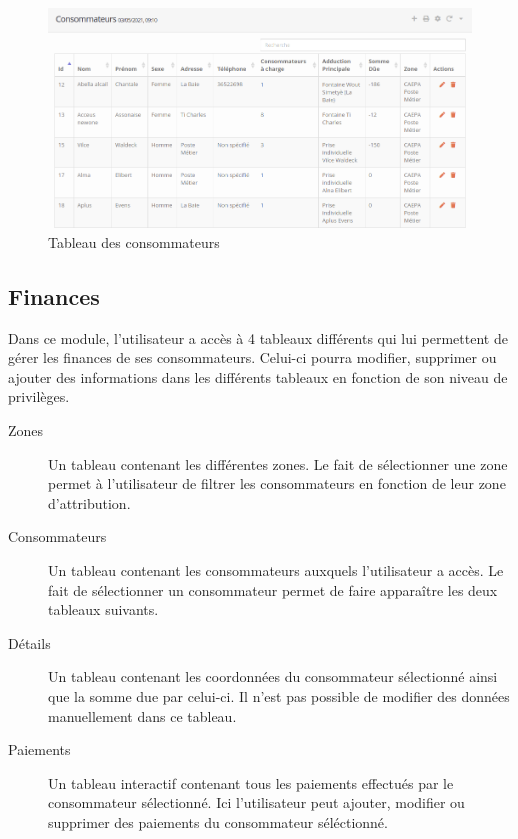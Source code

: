 \documentclass{EPL-master-thesis-covers-FR}
\begin{document}
				\begin{figure}[H]
					\centering
					\includegraphics[width=1\textwidth]{images/consumer_tab1}
					\caption{Tableau des consommateurs}
				\end{figure}
			
\newpage
			\subsection{Finances}
				Dans ce module, l'utilisateur a accès à 4 tableaux différents qui lui permettent de gérer les finances de ses consommateurs. Celui-ci pourra modifier, supprimer ou ajouter des informations dans les différents tableaux en fonction de son niveau de privilèges.
				\begin{description}
					\item[Zones] Un tableau contenant les différentes zones. Le fait de sélectionner une zone permet à l'utilisateur de filtrer les consommateurs en fonction de leur zone d'attribution.
					\item[Consommateurs] Un tableau contenant les consommateurs auxquels l'utilisateur a accès. Le fait de sélectionner un consommateur permet de faire apparaître les deux tableaux suivants.
					\item[Détails] Un tableau contenant les coordonnées du consommateur sélectionné ainsi que la somme due par celui-ci. Il n'est pas possible de modifier des données manuellement dans ce tableau.
					\item[Paiements] Un tableau interactif contenant tous les paiements effectués par le consommateur sélectionné. Ici l'utilisateur peut ajouter, modifier ou supprimer des paiements du consommateur séléctionné.
				\end{description}
				
\end{document}
